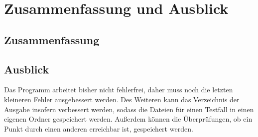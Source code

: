 \chapter{Zusammenfassung und Ausblick}\label{ch:zusammenfassung-und-ausblick}


\section{Zusammenfassung}\label{sec:zusammenfassung}

\section{Ausblick}\label{sec:ausblick}
Das Programm arbeitet bisher nicht fehlerfrei, daher muss noch die letzten kleineren Fehler ausgebessert werden.
Des Weiteren kann das Verzeichnis der Ausgabe insofern verbessert werden, sodass die Dateien für einen Testfall in einen eigenen Ordner gespeichert werden.
Außerdem können die Überprüfungen, ob ein Punkt durch einen anderen erreichbar ist, gespeichert werden.
